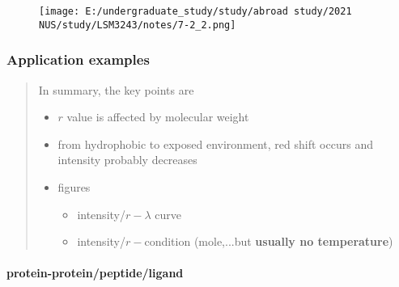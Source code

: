 \documentclass[]{article}
\let\oldparagraph\paragraph
\renewcommand{\paragraph}[1]{\oldparagraph{#1}\mbox{}}
\begin{document}
\begin{figure}
\centering
\texttt{[image: E:/undergraduate\_study/study/abroad study/2021 NUS/study/LSM3243/notes/7-2\_2.png]}
\caption{}
\end{figure}

\hypertarget{application-examples}{%
\subsubsection{Application examples}\label{application-examples}}

\begin{quote}
In summary, the key points are

\begin{itemize}
\item
  \(r\) value is affected by molecular weight
\item
  from hydrophobic to exposed environment, red shift occurs and
  intensity probably decreases
\item
  figures

  \begin{itemize}
  \item
    intensity/\(r-\lambda\) curve
  \item
    intensity/\(r-\)condition (mole,...but \textbf{usually no
    temperature})
  \end{itemize}
\end{itemize}
\end{quote}

\hypertarget{protein-proteinpeptideligand}{%
\paragraph{protein-protein/peptide/ligand}\label{protein-proteinpeptideligand}}
\end{document}
